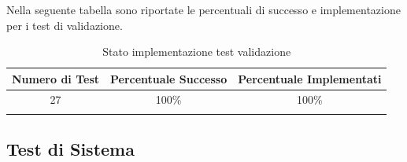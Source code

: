 \documentclass[../PianoDiQualifica.tex]{subfiles}
\begin{document}
Nella seguente tabella sono riportate le percentuali di successo e implementazione per i test di validazione.
\normalsize
\begin{longtable}{|c|c|c|}
	\hline
	\textbf{Numero di Test} & \textbf{Percentuale Successo} & \textbf{Percentuale Implementati}\\
	\hline
	\endhead
	27 & 
	100\% & 
	100\%\\
	\hline
	\caption[Stato implementazione test validazione]{Stato implementazione test validazione}
	\label{tabella:Stato implementazione test validazione}
\end{longtable}
	
\newpage
\subsection{Test di Sistema}
\normalsize
\end{document}
